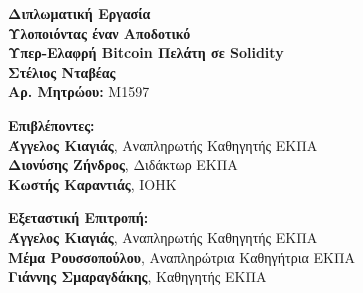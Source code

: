 \begin{center}
    \vspace{3cm}
    \large \textbf{Διπλωματική Εργασία}\\
    \vspace{3cm}
    \textbf{Υλοποιόντας έναν Αποδοτικό\\
    Υπερ-Ελαφρή Bitcoin Πελάτη σε Solidity}\\
    \vspace{3cm}
    \large \textbf{Στέλιος Νταβέας}\\
    \textbf{Αρ. Μητρώου:} M1597
    \vspace{5cm}
    \begin{flushleft}
        \textbf{Επιβλέποντες:}\\
        \hspace{1.5cm}
        \textbf{Άγγελος Κιαγιάς}, Αναπληρωτής Καθηγητής ΕΚΠΑ\\
        \hspace{1.5cm}
        \textbf{Διονύσης Ζήνδρος}, Διδάκτωρ ΕΚΠΑ\\
        \hspace{1.5cm}
        \textbf{Κωστής Καραντιάς}, IOHK



        \vspace{1cm}

        \textbf{Εξεταστική Επιτροπή:}\\
        \hspace{1.5cm}
        \textbf{Άγγελος Κιαγιάς}, Αναπληρωτής Καθηγητής ΕΚΠΑ\\
        \hspace{1.5cm}
        \textbf{Μέμα Ρουσσοπούλου}, Αναπληρώτρια Καθηγήτρια ΕΚΠΑ\\
        \hspace{1.5cm}
        \textbf{Γιάννης Σμαραγδάκης}, Καθηγητής ΕΚΠΑ

    \end{flushleft}
\end{center}

\pagebreak
